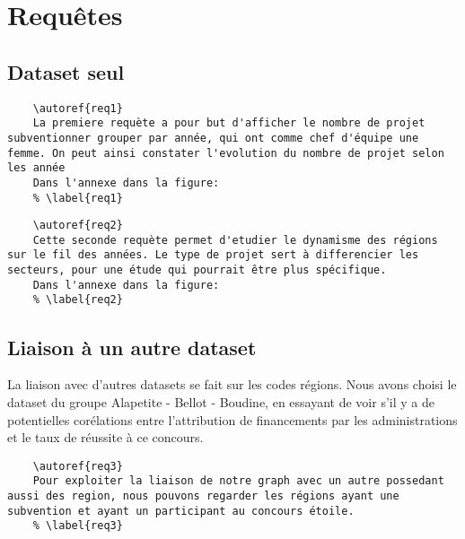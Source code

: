 \chapter{Requêtes}
\section{Dataset seul}

\begin{verbatim}
    \autoref{req1}
    La premiere requète a pour but d'afficher le nombre de projet subventionner grouper par année, qui ont comme chef d'équipe une femme. On peut ainsi constater l'evolution du nombre de projet selon les année
    Dans l'annexe dans la figure:
    % \label{req1}
\end{verbatim}

\begin{verbatim}
    \autoref{req2}
    Cette seconde requète permet d'etudier le dynamisme des régions sur le fil des années. Le type de projet sert à differencier les secteurs, pour une étude qui pourrait être plus spécifique.
    Dans l'annexe dans la figure:
    % \label{req2}
\end{verbatim}


\section{Liaison à un autre dataset}

La liaison avec d'autres datasets se fait sur les codes régions. Nous avons choisi le dataset du groupe Alapetite - Bellot - Boudine, en essayant de voir s'il y a de potentielles corélations entre l'attribution de financements par les administrations et le taux de réussite à ce concours.

\begin{verbatim}
    \autoref{req3}
    Pour exploiter la liaison de notre graph avec un autre possedant aussi des region, nous pouvons regarder les régions ayant une subvention et ayant un participant au concours étoile.
    % \label{req3}
\end{verbatim}


